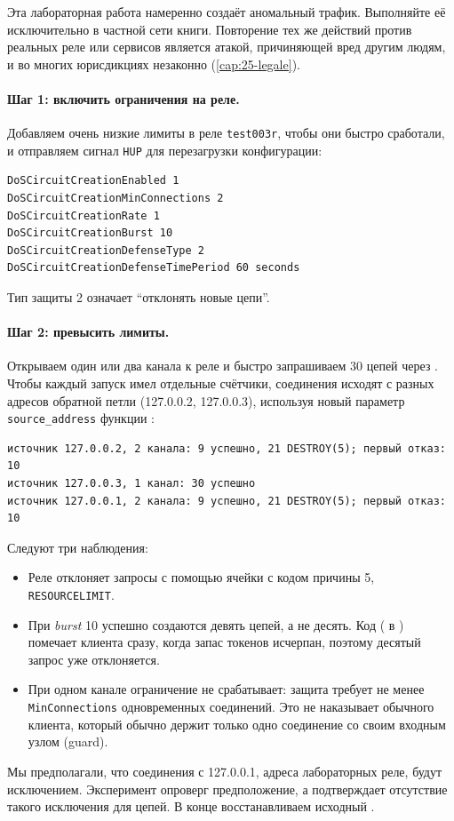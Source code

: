 \begin{attenzione}
Эта лабораторная работа намеренно создаёт аномальный трафик. Выполняйте её исключительно в частной сети книги. Повторение тех же действий против реальных реле или сервисов является атакой, причиняющей вред другим людям, и во многих юрисдикциях незаконно (\cref{cap:25-legale}).
\end{attenzione}

\paragraph{Шаг 1: включить ограничения на реле.} Добавляем очень низкие лимиты в  реле \texttt{test003r}, чтобы они быстро сработали, и отправляем сигнал \texttt{HUP} для перезагрузки конфигурации:
\begin{lstlisting}[language=torrc,numbers=none]
DoSCircuitCreationEnabled 1
DoSCircuitCreationMinConnections 2
DoSCircuitCreationRate 1
DoSCircuitCreationBurst 10
DoSCircuitCreationDefenseType 2
DoSCircuitCreationDefenseTimePeriod 60 seconds
\end{lstlisting}
Тип защиты 2 означает \enquote{отклонять новые цепи}.

\paragraph{Шаг 2: превысить лимиты.} Открываем один или два канала к реле и быстро запрашиваем 30 цепей через . Чтобы каждый запуск имел отдельные счётчики, соединения исходят с разных адресов обратной петли (127.0.0.2, 127.0.0.3), используя новый параметр \texttt{source\_address} функции :
\begin{lstlisting}[numbers=none]
источник 127.0.0.2, 2 канала: 9 успешно, 21 DESTROY(5); первый отказ: 10
источник 127.0.0.3, 1 канал: 30 успешно
источник 127.0.0.1, 2 канала: 9 успешно, 21 DESTROY(5); первый отказ: 10
\end{lstlisting}
Следуют три наблюдения:
\begin{itemize}
  \item Реле отклоняет запросы с помощью ячейки  с кодом причины 5, \texttt{RESOURCELIMIT}.
  \item При \emph{burst} 10 успешно создаются девять цепей, а не десять. Код ( в ) помечает клиента сразу, когда запас токенов исчерпан, поэтому десятый запрос уже отклоняется.
  \item При одном канале ограничение не срабатывает: защита требует не менее \texttt{MinConnections} одновременных соединений. Это не наказывает обычного клиента, который обычно держит только одно соединение со своим входным узлом (guard).
\end{itemize}
Мы предполагали, что соединения с 127.0.0.1, адреса лабораторных реле, будут исключением. Эксперимент опроверг предположение, а  подтверждает отсутствие такого исключения для цепей. В конце восстанавливаем исходный .

